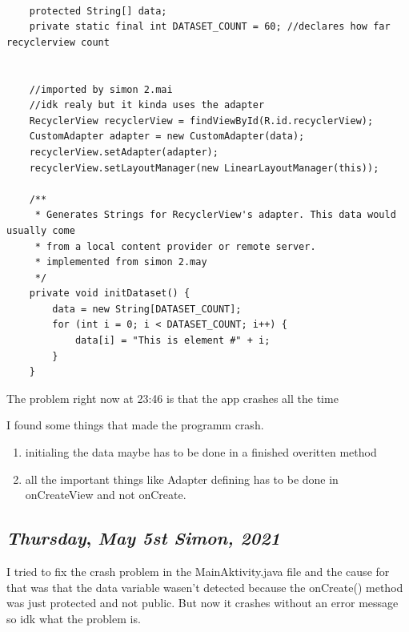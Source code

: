 \begin{lstlisting}

    protected String[] data;
    private static final int DATASET_COUNT = 60; //declares how far recyclerview count


    //imported by simon 2.mai
    //idk realy but it kinda uses the adapter
    RecyclerView recyclerView = findViewById(R.id.recyclerView);
    CustomAdapter adapter = new CustomAdapter(data);
    recyclerView.setAdapter(adapter);
    recyclerView.setLayoutManager(new LinearLayoutManager(this));

    /**
     * Generates Strings for RecyclerView's adapter. This data would usually come
     * from a local content provider or remote server.
     * implemented from simon 2.may
     */
    private void initDataset() {
        data = new String[DATASET_COUNT];
        for (int i = 0; i < DATASET_COUNT; i++) {
            data[i] = "This is element #" + i;
        }
    }
\end{lstlisting}

The problem right now at 23:46 is that the app crashes all the time

I found some things that made the programm crash. \\

\begin{enumerate}

\item initialing the data maybe has to be done in a finished overitten method 

\item all the important things like Adapter defining has to be done in onCreateView and not onCreate.

\end{enumerate}


\def\day{\textit{May 5st Simon, 2021}}
\def\weekday{\textit{Thursday}}
\subsection*{\weekday, \day}

I tried to fix the crash problem in the MainAktivity.java file and the cause for that was that the data variable wasen't detected because the onCreate() method was just protected 
and not public. But now it crashes without an error message so idk what the problem is.


























